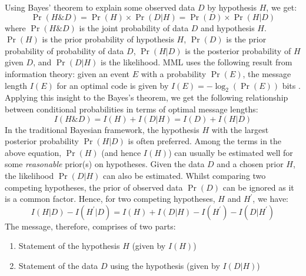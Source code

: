 \documentclass[wcp]{jmlr}
\begin{document}
Using Bayes' theorem to explain some observed data $D$ by hypothesis $H$, we get:
\begin{equation*}
  \Pr(H\&D) = \Pr(H) \times \Pr(D|H) = \Pr(D) \times \Pr(H|D)
\end{equation*}
where $\Pr(H\&D)$ is the joint probability of data $D$ and hypothesis $H$. $\Pr(H)$
is the prior probability of hypothesis $H$, $\Pr(D)$ is the prior probability of 
probability of data $D$, $\Pr(H|D)$ is the posterior probability of $H$
given $D$, and $\Pr(D|H)$ is the likelihood.
MML uses the following result from information theory: given an event $E$
with a probability $\Pr(E)$, the message length $I(E)$ for an optimal
code is given by $I(E) = -\log_2 (\Pr(E))$ bits \citep{shannon1948}. Applying this insight
to the Bayes's theorem, we get the following relationship between
conditional probabilities in terms of optimal message lengths:
\begin{equation*}
  I(H\&D) = I(H) + I(D|H) = I(D) + I(H|D)
\end{equation*}
In the traditional Bayesian framework, the hypothesis $H$ with
the largest posterior probability $\Pr(H|D)$ is often preferred.
Among the terms in the above equation, $\Pr(H)$ (and hence $I(H)$) can
usually be estimated well for some \emph{reasonable} prior(s) on hypotheses.
Given the data $D$ and a chosen prior $H$, the likelihood $\Pr(D|H)$ can also be estimated.
Whilst comparing two competing hypotheses, the prior of observed data $\Pr(D)$
can be ignored as it is a common factor. Hence, for two competing hypotheses, $H$ and $H^\prime$, we have:
\begin{equation*}
I(H|D) - I(H^\prime|D) = I(H) + I(D|H) - I(H^\prime) - I(D|H^\prime)
\end{equation*}
The message, therefore, comprises of two parts: 
\begin{enumerate}
\item Statement of the hypothesis $H$ (given by $I(H)$)  
\item Statement of the data $D$ using the hypothesis (given by $I(D|H)$) 
\end{enumerate}
\end{document}
